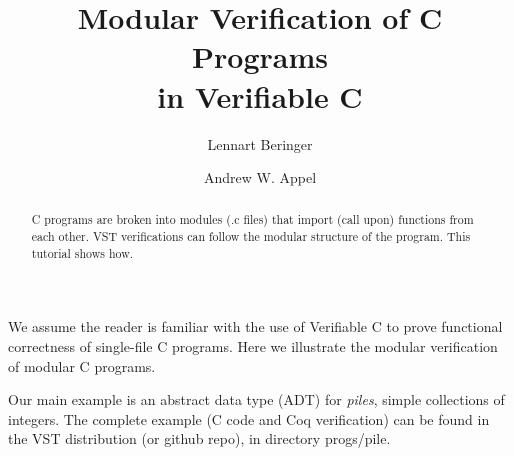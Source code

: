 \documentclass[runningheads,orivec]{llncs}
\begin{document}
%
\title{Modular Verification of C Programs \\ in Verifiable C}
\author{Lennart Beringer\and
Andrew W. Appel
}
\institute{\today}
\maketitle              %
\begin{abstract}
  C programs are broken into modules (.c files)
  that import (call upon) functions from each other.
  VST verifications can follow the modular structure of the program.
  This tutorial shows how.
\end{abstract}

We assume the reader is familiar with the use of Verifiable C to prove
functional correctness of single-file C programs.  Here we illustrate
the modular verification of modular C programs.

Our main example is an abstract data
type (ADT) for \emph{piles}, simple collections of integers.
The complete example (C code and Coq verification)
can be found in the VST distribution
(or github repo), in directory progs/pile.
\end{document}
